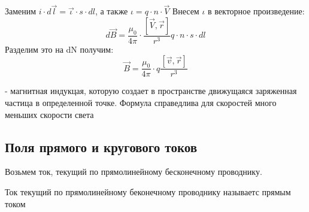 \documentclass[../main.tex]{subfiles}
\begin{document}
Заменим $i \cdot d \vec l = \vec \iota \cdot s \cdot dl$,  а также $\iota = q \cdot n \cdot \vec V$
Внесем $\iota$ в векторное произведение:
\[d \vec B = \frac{\mu_0}{4\pi} \cdot \frac{[\vec V, \vec r]}{r^3} q \cdot n \cdot s \cdot dl\]
Разделим это на dN получим:
\[ \vec B = \frac{\mu_0}{4 \pi} \cdot q\frac{[\vec v, \vec r]}{r^3}\]
\begin{center}
    - магнитная индукцая, которую создает в пространстве движущаяся заряженная частица в определенной точке. Формула справедлива для скоростей много 
    меньших скорости света
\end{center}

\subsection{Поля прямого и кругового токов}
Возьмем ток, текущий по прямолинейному бесконечному проводнику.

 Ток текущий по прямолинейному беконечному проводнику называетс прямым током 
\end{document}

